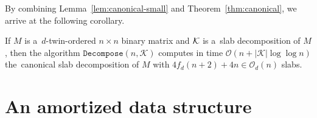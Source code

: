 \documentclass[runningheads]{llncs}
\newcommand{\Oh}{\mathcal{O}}
\begin{document}

By combining Lemma~\ref{lem:canonical-small} and Theorem~\ref{thm:canonical}, we arrive at the following corollary.

\begin{corollary}\label{cor:canonical}
	If $M$ is a~$d$-twin-ordered $n\times n$ binary matrix and $\cal K$ is a~slab decomposition of $M$, then the algorithm $\mathtt{Decompose}(n,\mathcal{K})$ computes in time  $\Oh(n+|\mathcal{K}|\log \log n)$ the~canonical slab decomposition of $M$ with
	$4 f_d (n+2)+4n \in \Oh_d(n)$ slabs.
\end{corollary}
 
\section{An amortized data structure}
\label{sec:amortized}
\end{document}
